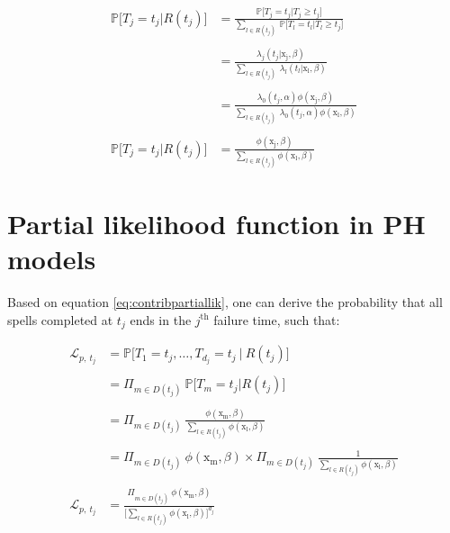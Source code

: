 \documentclass[
]{book}
\begin{document}
\begin{equation}
\begin{aligned}
  \mathbb{P}\big[T_j = t_j | R(t_j) \big] & = \frac{\mathbb{P}\big[T_j = t_j | T_j \geq t_j \big]}{\sum_{l \in R(t_j)} \ \mathbb{P}\big[T_l = t_l | T_l \geq t_j \big]} \\\\
  & = \frac{\lambda_j(t_j|\mathrm{x_j}, \beta)}{\sum_{l \in R(t_j)} \ \lambda_l(t_l|\mathrm{x_l}, \beta)} \\\\
  & = \frac{\lambda_0 (t_j, \alpha)\phi(\mathrm{x_j}, \beta)}{\sum_{l \in R(t_j)} \ \lambda_0 (t_j, \alpha)\phi(\mathrm{x_l}, \beta)} \\\\
  \mathbb{P}\big[T_j = t_j | R(t_j) \big] & = \frac{\phi(\mathrm{x_j}, \beta)}{\sum_{l \in R(t_j)} \phi(\mathrm{x_l}, \beta)}
\end{aligned}
\label{eq:contribpartiallikproof}
\end{equation}

\hypertarget{partial-likelihood-function-in-ph-models}{%
\section*{Partial likelihood function in PH models}\label{partial-likelihood-function-in-ph-models}}

Based on equation \eqref{eq:contribpartiallik}, one can derive the probability that all spells completed at \(t_j\) ends in the \(j^{\text{th}}\) failure time, such that:

\begin{equation}
\begin{aligned}
  \mathcal{L}_{p,\ t_j} & = \mathbb{P}\big[T_1 = t_j, \dots, T_{d_j} = t_j \ | \ R(t_j)\big] \\\\
  & = \Pi_{m \in D(t_j)} \ \mathbb{P}\big[T_m = t_j | R(t_j) \big] \\\\
  & = \Pi_{m \in D(t_j)} \ \frac{\phi(\mathrm{x_m}, \beta)}{\sum_{l \in R(t_j)} \phi(\mathrm{x_l}, \beta)} \\\\
  & = \Pi_{m \in D(t_j)} \ \phi(\mathrm{x_m}, \beta) \times \Pi_{m \in D(t_j)} \ \frac{1}{\sum_{l \in R(t_j)} \phi(\mathrm{x_l}, \beta)} \\\\
  \mathcal{L}_{p,\ t_j} & = \frac{\Pi_{m \in D(t_j)} \ \phi(\mathrm{x_m}, \beta)}{\Big[\sum_{l \in R(t_j)} \phi(\mathrm{x_l}, \beta)\Big]^{d_j}}
\end{aligned}
\label{eq:partlikproof}
\end{equation}
\end{document}

